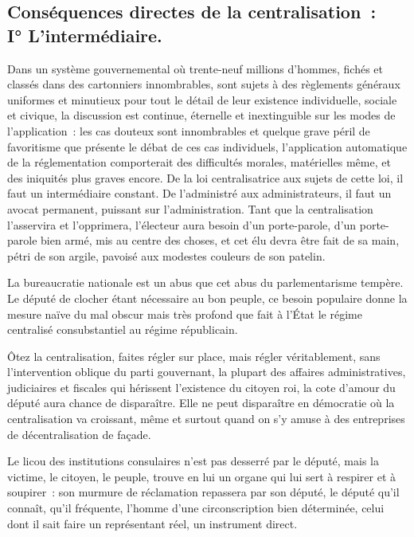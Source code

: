 \documentclass[french,twoside]{book} %
\begin{document}
\subsection[Conséquences directes de la centralisation : I° L’intermédiaire.]{Conséquences directes de la centralisation : \\
I° L’intermédiaire.}
\noindent Dans un système gouvernemental où trente-neuf millions d’hommes, fichés et classés dans des cartonniers innombrables, sont sujets à des règlements généraux uniformes et minutieux pour tout le détail de leur existence individuelle, sociale et civique, la discussion est continue, éternelle et inextinguible sur les modes de l’application : les cas douteux sont innombrables et quelque grave péril de favoritisme que présente le débat de ces cas individuels, l’application automatique de la réglementation comporterait des difficultés morales, matérielles même, et des iniquités plus graves encore. De la loi centralisatrice aux sujets de cette loi, il faut un intermédiaire constant. De l’administré aux administrateurs, il faut un avocat permanent, puissant sur l’administration. Tant que la centralisation l’asservira et l’opprimera, l’électeur aura besoin d’un porte-parole, d’un porte-parole bien armé, mis au centre des choses, et cet élu devra être fait de sa main, pétri de son argile, pavoisé aux modestes couleurs de son patelin.\par
La bureaucratie nationale est un abus que cet abus du parlementarisme tempère. Le député de clocher étant nécessaire au bon peuple, ce besoin populaire donne la mesure naïve du mal obscur mais très profond que fait à l’État le régime centralisé consubstantiel au régime républicain.\par
Ôtez la centralisation, faites régler sur place, mais régler véritablement, sans l’intervention oblique du parti gouvernant, la plupart des affaires administratives, judiciaires et fiscales qui hérissent l’existence du citoyen roi, la cote d’amour du député aura chance de disparaître. Elle ne peut disparaître en démocratie où la centralisation va croissant, même et surtout quand on s’y amuse à des entreprises de décentralisation de façade.\par
Le licou des institutions consulaires n’est pas desserré par le député, mais la victime, le citoyen, le peuple, trouve en lui un organe qui lui sert à respirer et à soupirer : son murmure de réclamation repassera par son député, le député qu’il connaît, qu’il fréquente, l’homme d’une circonscription bien déterminée, celui dont il sait faire un représentant réel, un instrument direct.\par
\end{document}
